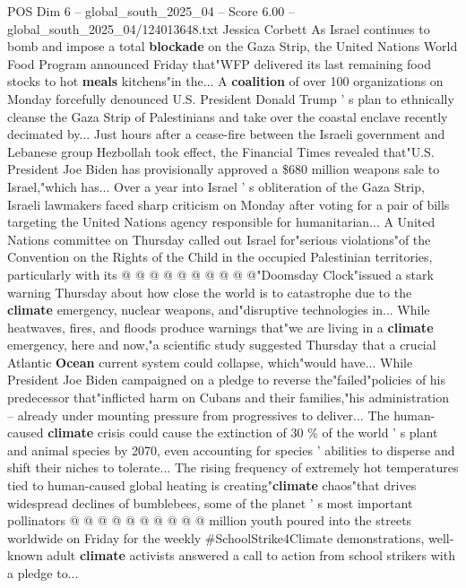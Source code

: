 \begin{textsample}{POS Dim 6 – global\_south\_2025\_04 – Score 6.00 – global\_south\_2025\_04/124013648.txt}  \label{ex:f6_pos_281}
Jessica Corbett As Israel continues to bomb and impose a total \textbf{blockade} on the Gaza Strip, the United Nations World Food Program announced Friday that"WFP delivered its last remaining food stocks to hot \textbf{meals} kitchens"in the...
A \textbf{coalition} of over 100 organizations on Monday forcefully denounced U.S.
President Donald Trump ' s plan to ethnically cleanse the Gaza Strip of Palestinians and take over the coastal enclave recently decimated by...
Just hours after a cease-fire between the Israeli government and Lebanese group Hezbollah took effect, the Financial Times revealed that"U.S.
President Joe Biden has provisionally approved a \$680 million weapons sale to Israel,"which has...
Over a year into Israel ' s obliteration of the Gaza Strip, Israeli lawmakers faced sharp criticism on Monday after voting for a pair of bills targeting the United Nations agency responsible for humanitarian...
A United Nations committee on Thursday called out Israel for"serious violations"of the Convention on the Rights of the Child in the occupied Palestinian territories, particularly with its @ @ @ @ @ @ @ @ @ @"Doomsday Clock"issued a stark warning Thursday about how close the world is to catastrophe due to the \textbf{climate} emergency, nuclear weapons, and"disruptive technologies in...
While heatwaves, fires, and floods produce warnings that"we are living in a \textbf{climate} emergency, here and now,"a scientific study suggested Thursday that a crucial Atlantic \textbf{Ocean} current system could collapse, which"would have...
While President Joe Biden campaigned on a pledge to reverse the"failed"policies of his predecessor that"inflicted harm on Cubans and their families,"his administration -- already under mounting pressure from progressives to deliver...
The human-caused \textbf{climate} crisis could cause the extinction of 30 \% of the world ' s plant and animal species by 2070, even accounting for species ' abilities to disperse and shift their niches to tolerate...
The rising frequency of extremely hot temperatures tied to human-caused global heating is creating"\textbf{climate} chaos"that drives widespread declines of bumblebees, some of the planet ' s most important pollinators @ @ @ @ @ @ @ @ @ @ million youth poured into the streets worldwide on Friday for the weekly \#SchoolStrike4Climate demonstrations, well-known adult \textbf{climate} activists answered a call to action from school strikers with a pledge to...

\end{textsample}
